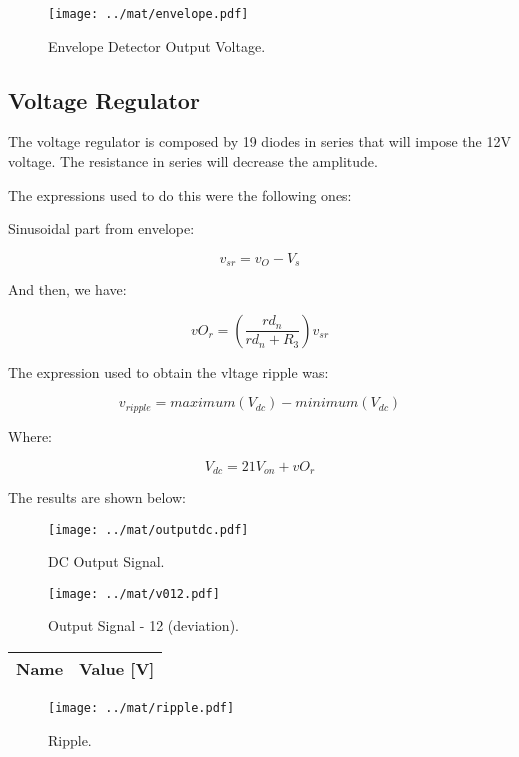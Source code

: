\begin{figure}[H] \centering
\texttt{[image: ../mat/envelope.pdf]}
\caption{Envelope Detector Output Voltage.}
\label{fig:envelopeth}
\end{figure}

\subsection{Voltage Regulator}
The voltage regulator is composed by 19 diodes in series that will impose the 12V voltage. The resistance in series will decrease the amplitude.\par
The expressions used to do this were the following ones:\par
Sinusoidal part from envelope:\par
\begin{equation}
    v_{sr} = v_O - V_s
\end{equation}\par
And then, we have: \par
\begin{equation}
    vO_r = (\frac{rd_n}{rd_n + R_3})v_{sr}
\end{equation}\par
The expression used to obtain the vltage ripple was: \par
\begin{equation}
    v_{ripple} = maximum(V_{dc})-minimum(V_{dc})
\end{equation}\par
Where: \par
\begin{equation}
    V_{dc} = 21V_{on} + vO_r
\end{equation}\par
The results are shown below:\par

\begin{figure}[H] \centering
\texttt{[image: ../mat/outputdc.pdf]}
\caption{DC Output Signal.}
\label{fig:outputdc}
\end{figure}

\begin{figure}[H] \centering
\texttt{[image: ../mat/v012.pdf]}
\caption{Output Signal - 12 (deviation).}
\label{fig:v012}
\end{figure}

\begin{table}[H]
  \centering
  \begin{tabular}{|l|r|}
    \hline    
    {\bf Name} & {\bf Value [V]} \\ \hline
    
  \end{tabular}
  \label{tab:ripple}
\end{table}

\begin{figure}[H] \centering
\texttt{[image: ../mat/ripple.pdf]}
\caption{Ripple.}
\label{fig:ripplegraph}
\end{figure}
